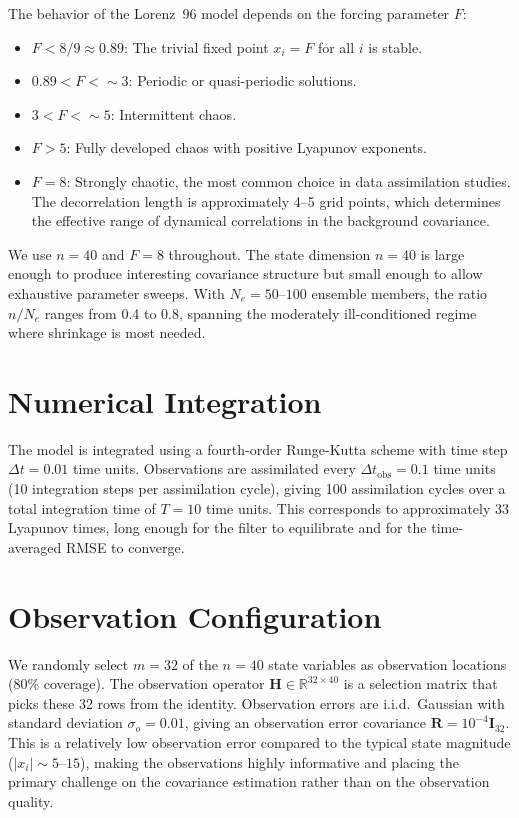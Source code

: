The behavior of the Lorenz~96 model depends on the forcing parameter $F$:
\begin{itemize}
\item $F < 8/9 \approx 0.89$: The trivial fixed point $x_i = F$ for all $i$ is stable.
\item $0.89 < F < \sim 3$: Periodic or quasi-periodic solutions.
\item $3 < F < \sim 5$: Intermittent chaos.
\item $F > 5$: Fully developed chaos with positive Lyapunov exponents.
\item $F = 8$: Strongly chaotic, the most common choice in data assimilation studies. The decorrelation length is approximately 4--5 grid points, which determines the effective range of dynamical correlations in the background covariance.
\end{itemize}

We use $n = 40$ and $F = 8$ throughout. The state dimension $n = 40$ is large enough to produce interesting covariance structure but small enough to allow exhaustive parameter sweeps. With $N_e = 50$--$100$ ensemble members, the ratio $n/N_e$ ranges from 0.4 to 0.8, spanning the moderately ill-conditioned regime where shrinkage is most needed.

\section{Numerical Integration}

The model is integrated using a fourth-order Runge-Kutta scheme with time step $\Delta t = 0.01$ time units. Observations are assimilated every $\Delta t_{\text{obs}} = 0.1$ time units (10 integration steps per assimilation cycle), giving 100 assimilation cycles over a total integration time of $T = 10$ time units. This corresponds to approximately 33 Lyapunov times, long enough for the filter to equilibrate and for the time-averaged RMSE to converge.

\section{Observation Configuration}

We randomly select $m = 32$ of the $n = 40$ state variables as observation locations (80\% coverage). The observation operator $\mathbf{H} \in \mathbb{R}^{32 \times 40}$ is a selection matrix that picks these 32 rows from the identity. Observation errors are i.i.d.\ Gaussian with standard deviation $\sigma_o = 0.01$, giving an observation error covariance $\mathbf{R} = 10^{-4} \mathbf{I}_{32}$. This is a relatively low observation error compared to the typical state magnitude ($|x_i| \sim 5$--$15$), making the observations highly informative and placing the primary challenge on the covariance estimation rather than on the observation quality.

